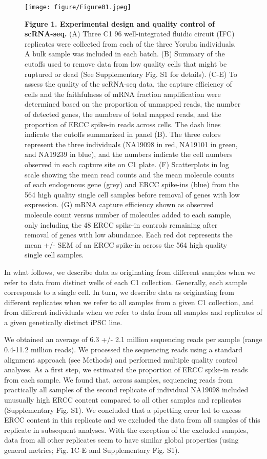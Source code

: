 \begin{figure}[htbp]
\centering
\texttt{[image: figure/Figure01.jpeg]}
\caption{\textbf{Figure 1. Experimental design and quality control of
scRNA-seq.} (A) Three C1 96 well-integrated fluidic circuit (IFC)
replicates were collected from each of the three Yoruba individuals. A
bulk sample was included in each batch. (B) Summary of the cutoffs used
to remove data from low quality cells that might be ruptured or dead
(See Supplementary Fig. S1 for details). (C-E) To assess the quality of
the scRNA-seq data, the capture efficiency of cells and the faithfulness
of mRNA fraction amplification were determined based on the proportion
of unmapped reads, the number of detected genes, the numbers of total
mapped reads, and the proportion of ERCC spike-in reads across cells.
The dash lines indicate the cutoffs summarized in panel (B). The three
colors represent the three individuals (NA19098 in red, NA19101 in
green, and NA19239 in blue), and the numbers indicate the cell numbers
observed in each capture site on C1 plate. (F) Scatterplots in log scale
showing the mean read counts and the mean molecule counts of each
endogenous gene (grey) and ERCC spike-ins (blue) from the 564 high
quality single cell samples before removal of genes with low expression.
(G) mRNA capture efficiency shown as observed molecule count versus
number of molecules added to each sample, only including the 48 ERCC
spike-in controls remaining after removal of genes with low abundance.
Each red dot represents the mean +/- SEM of an ERCC spike-in across the
564 high quality single cell samples.}
\end{figure}

In what follows, we describe data as originating from different samples
when we refer to data from distinct wells of each C1 collection.
Generally, each sample corresponds to a single cell. In turn, we
describe data as originating from different replicates when we refer to
all samples from a given C1 collection, and from different individuals
when we refer to data from all samples and replicates of a given
genetically distinct iPSC line.

We obtained an average of 6.3 +/- 2.1 million sequencing reads per
sample (range 0.4-11.2 million reads). We processed the sequencing reads
using a standard alignment approach (see Methods) and performed multiple
quality control analyses. As a first step, we estimated the proportion
of ERCC spike-in reads from each sample. We found that, across samples,
sequencing reads from practically all samples of the second replicate of
individual NA19098 included unusually high ERCC content compared to all
other samples and replicates (Supplementary Fig. S1). We concluded that
a pipetting error led to excess ERCC content in this replicate and we
excluded the data from all samples of this replicate in subsequent
analyses. With the exception of the excluded samples, data from all
other replicates seem to have similar global properties (using general
metrics; Fig. 1C-E and Supplementary Fig. S1).

